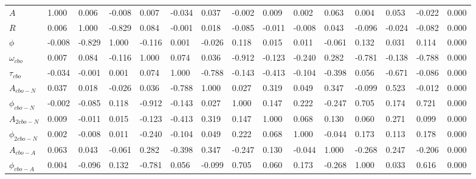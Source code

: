 \begin{landscape}
\begin{table}[]
\setlength\tabcolsep{5pt}
\footnotesize
\begin{tabular*}{\linewidth}{@{\extracolsep{\fill}}lLBLLLLLLLLLLLL}
  \toprule
            &  &  & \thead{$\phi$} &  &  &  &  &  &  &  &  &  &  &  \\
  \midrule
$A$                & 1.000 & 0.006 & -0.008 & 0.007 & -0.034 & 0.037 & -0.002 & 0.009 & 0.002 & 0.063 & 0.004 & 0.053 & -0.022 & 0.000  \\
$R$                & 0.006 & 1.000 & -0.829 & 0.084 & -0.001 & 0.018 & -0.085 & -0.011 & -0.008 & 0.043 & -0.096 & -0.024 & -0.082 & 0.000  \\
$\phi$             & -0.008 & -0.829 & 1.000 & -0.116 & 0.001 & -0.026 & 0.118 & 0.015 & 0.011 & -0.061 & 0.132 & 0.031 & 0.114 & 0.000  \\
$\omega_{cbo}$     & 0.007 & 0.084 & -0.116 & 1.000 & 0.074 & 0.036 & -0.912 & -0.123 & -0.240 & 0.282 & -0.781 & -0.138 & -0.788 & 0.000  \\
$\tau_{cbo}$       & -0.034 & -0.001 & 0.001 & 0.074 & 1.000 & -0.788 & -0.143 & -0.413 & -0.104 & -0.398 & 0.056 & -0.671 & -0.086 & 0.000  \\
$A_{cbo-N}$        & 0.037 & 0.018 & -0.026 & 0.036 & -0.788 & 1.000 & 0.027 & 0.319 & 0.049 & 0.347 & -0.099 & 0.523 & -0.012 & 0.000  \\
$\phi_{cbo-N}$     & -0.002 & -0.085 & 0.118 & -0.912 & -0.143 & 0.027 & 1.000 & 0.147 & 0.222 & -0.247 & 0.705 & 0.174 & 0.721 & 0.000  \\
$A_{2cbo-N}$       & 0.009 & -0.011 & 0.015 & -0.123 & -0.413 & 0.319 & 0.147 & 1.000 & 0.068 & 0.130 & 0.060 & 0.271 & 0.099 & 0.000  \\
$\phi_{2cbo-N}$    & 0.002 & -0.008 & 0.011 & -0.240 & -0.104 & 0.049 & 0.222 & 0.068 & 1.000 & -0.044 & 0.173 & 0.113 & 0.178 & 0.000  \\
$A_{cbo-A}$        & 0.063 & 0.043 & -0.061 & 0.282 & -0.398 & 0.347 & -0.247 & 0.130 & -0.044 & 1.000 & -0.268 & 0.247 & -0.206 & 0.000  \\
$\phi_{cbo-A}$     & 0.004 & -0.096 & 0.132 & -0.781 & 0.056 & -0.099 & 0.705 & 0.060 & 0.173 & -0.268 & 1.000 & 0.033 & 0.616 & 0.000  \\

\end{tabular*}
\end{table}
\end{landscape}
